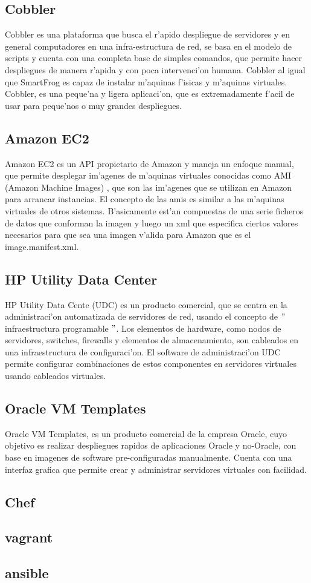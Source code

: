 \subsection{Cobbler}
Cobbler es una plataforma que busca el r'apido despliegue de servidores y en general computadores en una infra-estructura de red, se basa en el modelo de scripts y cuenta con una completa base de simples comandos, que permite hacer despliegues de manera r'apida y con poca intervenci'on humana. Cobbler al igual que SmartFrog es capaz de instalar m'aquinas f'isicas y m'aquinas virtuales. Cobbler, es una peque'na y ligera aplicaci'on, que es extremadamente f'acil de usar para peque'nos o muy grandes despliegues. \cite{6}

\subsection{Amazon EC2}
Amazon EC2 es un API propietario de Amazon y maneja un enfoque manual, que permite desplegar im'agenes de m'aquinas virtuales conocidas como AMI (Amazon Machine Images) \cite{9}, que son las im'agenes que se utilizan en Amazon para arrancar instancias. El concepto de las amis es similar a las m'aquinas virtuales de otros sistemas. B'asicamente est'an compuestas de una serie ficheros de datos que conforman la imagen y luego un xml que especifica ciertos valores necesarios para que sea una imagen v'alida para Amazon que es el image.manifest.xml. 

\subsection{HP Utility Data Center}
HP Utility Data Cente (UDC) es un producto comercial, que se centra en la administraci'on automatizada de servidores de red, usando el concepto de $"$infraestructura programable $"$. Los elementos de hardware, como nodos de servidores, switches, firewalls y elementos de almacenamiento, son cableados en una infraestructura de configuraci'on. El software de administraci'on UDC permite configurar combinaciones de estos componentes en servidores virtuales usando cableados virtuales. \cite{15}

\subsection{Oracle VM Templates}
Oracle VM Templates, es un producto comercial de la empresa Oracle, cuyo objetivo es realizar despliegues rapidos de aplicaciones Oracle y no-Oracle, con base en imagenes de software pre-configuradas manualmente. Cuenta con una interfaz grafica que permite crear y administrar servidores virtuales con facilidad. \cite{14}

\subsection{Chef}
\subsection{vagrant}
\subsection{ansible}


